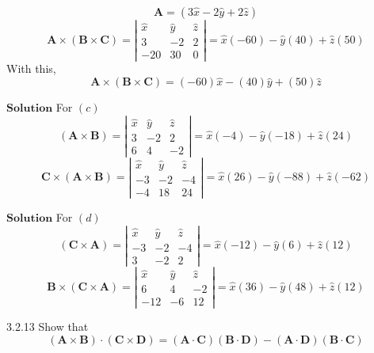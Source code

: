 $$\mathbf{A}=(3 \hat{x}-2 \hat{y}+2 \hat{z})$$
$$\mathbf{A} \times(\mathbf{B} \times \mathbf{C})=\left|\begin{array}{ccc}\hat{x} & \hat{y} & \hat{z} \\ 3 & -2 & 2 \\ -20 & 30 & 0\end{array}\right|=\hat{x}(-60)-\hat{y}(40)+\hat{z}(50)$$
With this, $$\mathbf{A} \times(\mathbf{B} \times \mathbf{C})=(-60) \hat{x}-(40) \hat{y}+(50) \hat{z}$$




$\boxed{\textbf{Solution}}$ For $(c)$ 
$$(\mathbf{A} \times \mathbf{B})=\left|\begin{array}{ccc}\hat{x} & \hat{y} & \hat{z} \\ 3 & -2 & 2 \\ 6 & 4 & -2\end{array}\right|=\hat{x}(-4)-\hat{y}(-18)+\hat{z}(24)$$
$$\mathbf{C} \times(\mathbf{A} \times \mathbf{B})=\left|\begin{array}{ccc}\hat{x} & \hat{y} & \hat{z} \\ -3 & -2 & -4 \\ -4 & 18 & 24\end{array}\right|=\hat{x}(26)-\hat{y}(-88)+\hat{z}(-62)$$




$\boxed{\textbf{Solution}}$ For $(d)$ 
$$(\mathbf{C} \times \mathbf{A})=\left|\begin{array}{ccc}\hat{x} & \hat{y} & \hat{z} \\ -3 & -2 & -4 \\ 3 & -2 & 2\end{array}\right|=\hat{x}(-12)-\hat{y}(6)+\hat{z}(12)$$
$$\mathbf{B} \times(\mathbf{C} \times \mathbf{A})=\left|\begin{array}{ccc}\hat{x} & \hat{y} & \hat{z} \\ 6 & 4 & -2 \\ -12 & -6 & 12\end{array}\right|=\hat{x}(36)-\hat{y}(48)+\hat{z}(12)$$

\newpage


\begin{mybox}{3.2.13}
Show that
$$
(\mathbf{A} \times \mathbf{B}) \cdot(\mathbf{C} \times \mathbf{D})=(\mathbf{A} \cdot \mathbf{C})(\mathbf{B} \cdot \mathbf{D})-(\mathbf{A} \cdot \mathbf{D})(\mathbf{B} \cdot \mathbf{C})
$$
\end{mybox}

